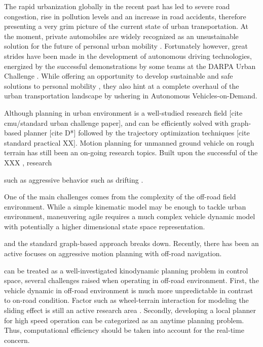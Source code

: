 \documentclass[../thesis.tex]{subfiles}
\begin{document}

The rapid urbanization globally in the recent past has led to severe road congestion, rise in pollution levels and an increase in road accidents, therefore presenting a very grim picture of the current state of urban transportation. At the moment, private automobiles are widely recognized as an unsustainable solution for the future of personal urban mobility \cite{reinventing}. Fortunately however, great strides have been made in the development of autonomous driving technologies, energized by the successful demonstrations by some teams at the DARPA Urban Challenge \cite{boss, multimodaltartan}. While offering an opportunity to develop sustainable and safe solutions to personal mobility \cite{usecases_of_AD}, they also hint at a complete overhaul of the urban transportation landscape by ushering in Autonomous Vehicles-on-Demand. 


Although planning in urban environment is a well-studied research field [cite cmu/standard urban challenge paper], and can be efficiently solved with graph-based planner [cite D*] followed by the trajectory optimization techniques [cite standard practical XX]. 
Motion planning for unmanned ground vehicle on rough terrain has still been an on-going research topics. Built upon the successful of the XXX \cite{}, research 

such as aggressive behavior 
such as drifting \cite{}.

One of the main challenges comes from the complexity of the off-road field environment. While a simple kinematic model may be enough to tackle urban environment, maneuvering agile requires a much complex vehicle dynamic model with potentially a higher dimensional state space representation. 

and the standard graph-based approach breaks down. Recently, there has been an active focuses on aggressive motion planning with off-road navigation.  


can be treated as a well-investigated kinodynamic planning problem in control space, several challenges raised when operating in off-road environment. 
First, the vehicle dynamic in off-road environment is much more unpredictable in contrast to on-road condition. Factor such as wheel-terrain interaction for modeling the sliding effect is still an active research area . 
Secondly, developing a local planner for high speed operation can be categorized as an anytime planning problem. Thus, computational efficiency should be taken into account for the real-time concern.
\end{document}
